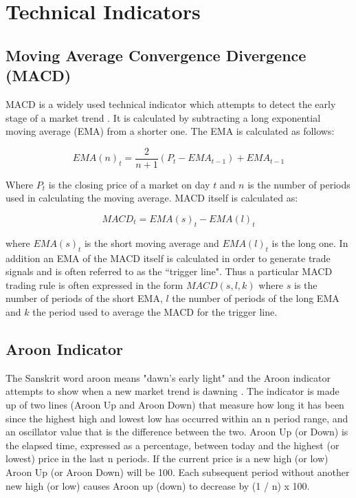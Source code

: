 
\chapter{Technical Indicators} %

\label{AppendixB} %



\section{Moving Average Convergence Divergence (MACD)}
\label{appB:MACD}
MACD is a widely used technical indicator which attempts to detect the early stage of a market trend \citep{appel2007understanding}. It is calculated by subtracting a long exponential moving average (EMA) from a shorter one. The EMA is calculated as follows:

\[ EMA(n)_{t} = \dfrac{2}{n+1}(P_{t}-EMA_{t-1}) + EMA_{t-1}\]

Where $ P_{t} $ is the closing price of a market on day $ t $ and $ n $ is the number of periods used in calculating the moving average. MACD itself is calculated as:

\[ MACD_{t} = EMA(s)_{t} - EMA(l)_{t} \]

where $ EMA(s)_{t} $ is the short moving average and $ EMA(l)_{t} $ is the long one. In addition an EMA of the MACD itself is calculated in order to generate trade signals and is often referred to as the \textquotedblleft trigger line". Thus a particular MACD trading rule is often expressed in the form $ MACD(s,l,k) $ where $ s $ is the number of periods of the short EMA, $ l $ the number of periods of the long EMA and $ k $ the period used to average the MACD for the trigger line.

\section{Aroon Indicator}
\label{appB:aroon}
The Sanskrit word aroon means "dawn's early light" and the Aroon indicator attempts to show when a new market trend is dawning \citep{chande1994new}. The indicator is made up of two lines (Aroon Up and Aroon Down) that measure how long it has been since the highest high and lowest low has occurred within an n period range, and an oscillator value that is the difference between the two. Aroon Up (or Down) is the elapsed time, expressed as a percentage, between today and the highest (or lowest) price in the last n periods. If the current price is a new high (or low) Aroon Up (or Aroon Down) will be 100. Each subsequent period without another new high (or low) causes Aroon up (down) to decrease by (1 / n) x 100.

